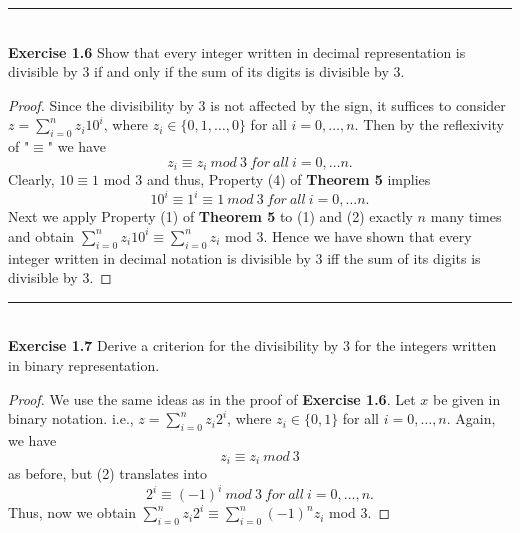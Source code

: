 \documentclass[a4paper]{article}
\begin{document}
\noindent\rule{12cm}{0.4pt}\\
\noindent \textbf{Exercise 1.6} Show that every integer written in decimal representation is divisible by $3$ if and only if the sum of its digits is divisible by $3$.
\begin{proof}
Since the divisibility by 3 is not affected by the sign, it suffices to consider $z= \sum_{i=0}^{n}{z_{i}10^{i}}$, where $z_{i} \in \{0,1,\ldots,0\}$ for all $i = 0, \ldots, n$. Then by the reflexivity of "$\equiv$" we have
\begin{equation}
z_{i} \equiv z_{i}\ mod\ 3\ for\ all\ i = 0, \ldots n.
\end{equation}
Clearly, $10 \equiv 1$ mod $3$ and thus, Property (4) of \textbf{Theorem 5} implies
\begin{equation}
10^{i} \equiv 1^{i} \equiv 1\ mod\ 3\ for\ all\ i = 0, \ldots n.
\end{equation}
Next we apply Property (1) of \textbf{Theorem 5} to (1) and (2) exactly $n$ many times and obtain $\sum_{i=0}^{n}{z_{i}10^{i}} \equiv \sum_{i=0}^{n}{z_{i}}$ mod $3$. Hence we have shown that every integer written in decimal notation is divisible by $3$ iff the sum of its digits is divisible by $3$. 
\end{proof}



\noindent\rule{12cm}{0.4pt}\\
\noindent \textbf{Exercise 1.7} Derive a criterion for the divisibility by $3$ for the integers written in binary representation.
\begin{proof}
We use the same ideas as in the proof of \textbf{Exercise 1.6}. Let $x$ be given in binary notation. i.e., $z=\sum_{i=0}^{n}{z_{i}2^{i}}$, where $z_{i} \in \{ 0,1 \}$ for all $i = 0, \ldots, n$. Again, we have
\begin{equation}
z_{i} \equiv z_{i}\ mod\ 3
\end{equation}
as before, but (2) translates into
\begin{equation}
2^{i} \equiv (-1)^{i}\ mod\ 3\ for\ all\ i=0, \ldots, n.
\end{equation}
Thus, now we obtain $\sum_{i=0}^{n}{z_{i}2^{i}} \equiv \sum_{i=0}^{n}{(-1)^{n}z_{i}}$ mod $3$.
\end{proof}
\end{document}

